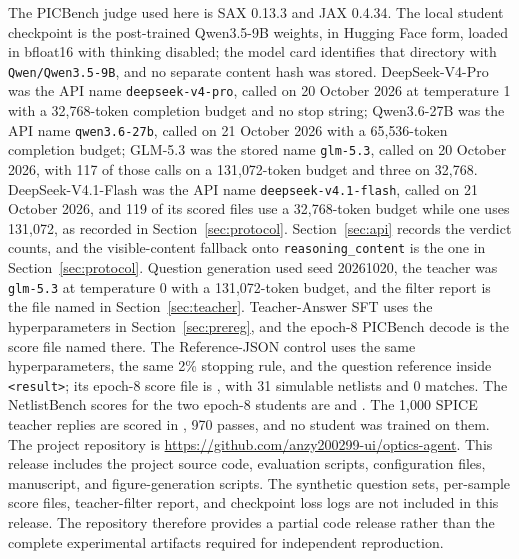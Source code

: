 \documentclass[11pt]{article}
\begin{document}
The PICBench judge used here is SAX 0.13.3 and JAX 0.4.34.
The local student checkpoint is the post-trained Qwen3.5-9B weights, in Hugging Face form, loaded in bfloat16 with thinking disabled; the model card identifies that directory with \texttt{Qwen/Qwen3.5-9B}, and no separate content hash was stored.
DeepSeek-V4-Pro was the API name \texttt{deepseek-v4-pro}, called on 20 October 2026 at temperature 1 with a 32{,}768-token completion budget and no stop string; Qwen3.6-27B was the API name \texttt{qwen3.6-27b}, called on 21 October 2026 with a 65{,}536-token completion budget; GLM-5.3 was the stored name \texttt{glm-5.3}, called on 20 October 2026, with 117 of those calls on a 131{,}072-token budget and three on 32{,}768.
DeepSeek-V4.1-Flash was the API name \texttt{deepseek-v4.1-flash}, called on 21 October 2026, and 119 of its scored files use a 32{,}768-token budget while one uses 131{,}072, as recorded in Section~\ref{sec:protocol}.
Section~\ref{sec:api} records the verdict counts, and the visible-content fallback onto \texttt{reasoning\_content} is the one in Section~\ref{sec:protocol}.
Question generation used seed 20261020, the teacher was \texttt{glm-5.3} at temperature 0 with a 131{,}072-token budget, and the filter report is the file named in Section~\ref{sec:teacher}.
Teacher-Answer SFT uses the hyperparameters in Section~\ref{sec:prereg}, and the epoch-8 PICBench decode is the score file named there.
The Reference-JSON control uses the same hyperparameters, the same 2\% stopping rule, and the question reference inside \texttt{\textless result\textgreater}; its epoch-8 score file is , with 31 simulable netlists and 0 matches.
The NetlistBench scores for the two epoch-8 students are  and .
The 1{,}000 SPICE teacher replies are scored in , 970 passes, and no student was trained on them.
The project repository is \url{https://github.com/anzy200299-ui/optics-agent}. This release includes the project source code, evaluation scripts, configuration files, manuscript, and figure-generation scripts. The synthetic question sets, per-sample score files, teacher-filter report, and checkpoint loss logs are not included in this release. The repository therefore provides a partial code release rather than the complete experimental artifacts required for independent reproduction.
\end{document}
